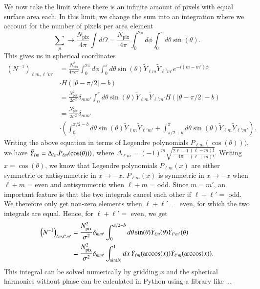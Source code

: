 \documentclass[twocolumn]{../common/aa}
\begin{document}
We now take the limit where there is an infinite amount of pixels with equal surface area each. In this limit, we change the sum into an integration where we account for the number of pixels per area element
\begin{equation}
\sum_p \rightarrow \frac{N_{\mathrm{pix}}}{4\pi}\int d\Omega  = \frac{N_{\mathrm{pix}}}{4\pi}\int_{0}^{2\pi} d\phi \int_{0}^{\pi} d\theta \sin(\theta).
\end{equation}
This gives us in spherical coordinates
\begin{align}
\nonumber
\left(N^{-1}\right)_{\ell m, \ell' m'} &= \frac{N_{\mathrm{pix}}^2}{4\pi \sigma^2}\int_{0}^{2\pi} d\phi \int_{0}^{\pi} d\theta \sin(\theta)\tilde{Y}_{\ell m}  \tilde{Y}_{\ell' m'}  e^{-i(m-m')\phi}
\\
\nonumber
&\cdot H(|\theta -\pi/2|-b)\\
\nonumber
&= \frac{N_{\mathrm{pix}}^2}{2\sigma^2} \delta_{mm'}\int_{0}^{\pi} d\theta \sin(\theta)\tilde{Y}_{\ell m}  \tilde{Y}_{\ell' m'} H(|\theta -\pi/2|-b)\\
\nonumber
&= \frac{N_{\mathrm{pix}}^2}{2\sigma^2} \delta_{mm'}\\
&\cdot \left(\int_{0}^{\pi/2-b} d\theta \sin(\theta) \tilde{Y}_{\ell m}  \tilde{Y}_{\ell' m'}+\int_{\pi/2+b}^{\pi} d\theta \sin(\theta)\tilde{Y}_{\ell m}  \tilde{Y}_{\ell' m'}\right).
\end{align}
Writing the above equation in terms of Legendre polynomials $P_{\ell m}(\cos(\theta)))$, we have
$\Tilde{Y}_{\ell m} = \Delta_{\ell m}P_{\ell m}(\cos(\theta)))$, where ${\Delta_{\ell m}=(-1)^m \sqrt{\frac{2\ell+1}{4\pi}\frac{(\ell - m)!}{(\ell+m)!}}}$.
 Writing $x=\cos(\theta)$, we know that Legendre polynomials $P_{\ell m}(x)$ are either symmetric or antisymmetric in $x\rightarrow-x$. $P_{\ell m}(x)$ is symmetric in $x \rightarrow -x$ when $\ell+m$ = even and antisymmetric when $\ell+m$ = odd. Since $m=m'$, an important feature is that the two integrals cancel each other if $\ell+\ell' =$ odd. We therefore only get non-zero elements when $\ell + \ell' =$ even, for which the two integrals are equal. Hence, for $\ell + \ell'=$ even, we get
\begin{align}
\nonumber
\left(N^{-1}\right)_{\ell m, \ell' m'} &= \frac{N_{\mathrm{pix}}^2}{\sigma^2} \delta_{mm'}\int_{0}^{\pi/2-b} d\theta \sin(\theta)\Tilde{Y}_{\ell m}(\theta)\Tilde{Y}_{\ell' m'}(\theta)\\
\label{eq:finished_n_inv}
&=\frac{N_{\mathrm{pix}}^2}{\sigma^2} \delta_{mm'}\int_{\sin(b)}^{1} dx \, \Tilde{Y}_{\ell m}(\arccos(x)) \Tilde{Y}_{\ell' m}(\arccos(x)).
\end{align}
This integral can be solved numerically by gridding $x$ and the spherical harmonics without phase can be calculated in Python using a library like ...
\end{document}
